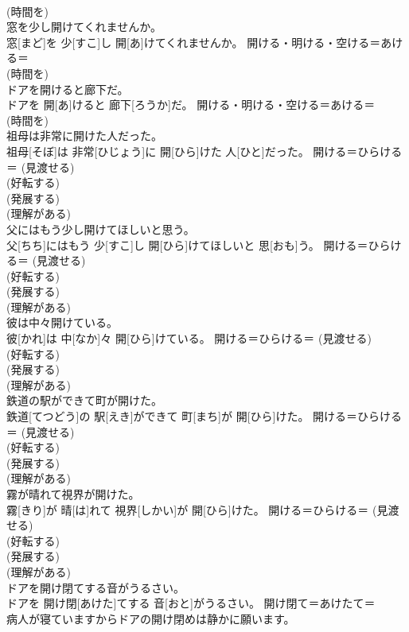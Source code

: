 \documentclass[8pt]{extreport}
\begin{document}
\begin{CJK}{UTF8}{min}
{\\	(時間を) 
\\	窓を少し開けてくれませんか。	
\\	窓[まど]を 少[すこ]し 開[あ]けてくれませんか。	開ける・明ける・空ける＝あける＝ 
\\	(時間を) 
\\	ドアを開けると廊下だ。	
\\	ドアを 開[あ]けると 廊下[ろうか]だ。	開ける・明ける・空ける＝あける＝ 
\\	(時間を) 
\\	祖母は非常に開けた人だった。	
\\	祖母[そぼ]は 非常[ひじょう]に 開[ひら]けた 人[ひと]だった。	開ける＝ひらける＝ (見渡せる) 
\\	(好転する) 
\\	(発展する) 
\\	(理解がある)
\\	父にはもう少し開けてほしいと思う。	
\\	父[ちち]にはもう 少[すこ]し 開[ひら]けてほしいと 思[おも]う。	開ける＝ひらける＝ (見渡せる) 
\\	(好転する) 
\\	(発展する) 
\\	(理解がある)
\\	彼は中々開けている。	
\\	彼[かれ]は 中[なか]々 開[ひら]けている。	開ける＝ひらける＝ (見渡せる) 
\\	(好転する) 
\\	(発展する) 
\\	(理解がある)
\\	鉄道の駅ができて町が開けた。	
\\	鉄道[てつどう]の 駅[えき]ができて 町[まち]が 開[ひら]けた。	開ける＝ひらける＝ (見渡せる) 
\\	(好転する) 
\\	(発展する) 
\\	(理解がある)
\\	霧が晴れて視界が開けた。	
\\	霧[きり]が 晴[は]れて 視界[しかい]が 開[ひら]けた。	開ける＝ひらける＝ (見渡せる) 
\\	(好転する) 
\\	(発展する) 
\\	(理解がある)
\\	ドアを開け閉てする音がうるさい。	
\\	ドアを 開け閉[あけた]てする 音[おと]がうるさい。	開け閉て＝あけたて＝ 
\\	病人が寝ていますからドアの開け閉めは静かに願います。	
}
\end{CJK}
\end{document}
